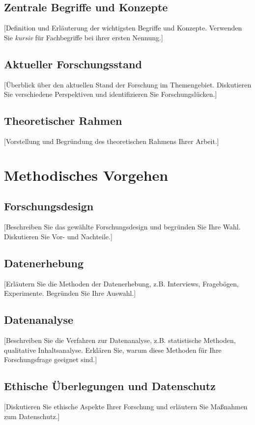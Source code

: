 \documentclass[12pt,a4paper,oneside]{article}
\begin{document}
\subsection{Zentrale Begriffe und Konzepte}
[Definition und Erläuterung der wichtigsten Begriffe und Konzepte. Verwenden Sie \textit{kursiv} für Fachbegriffe bei ihrer ersten Nennung.]

\subsection{Aktueller Forschungsstand}
[Überblick über den aktuellen Stand der Forschung im Themengebiet. Diskutieren Sie verschiedene Perspektiven und identifizieren Sie Forschungslücken.]

\subsection{Theoretischer Rahmen}
[Vorstellung und Begründung des theoretischen Rahmens Ihrer Arbeit.]

\clearpage
\section{Methodisches Vorgehen}
\subsection{Forschungsdesign}
[Beschreiben Sie das gewählte Forschungsdesign und begründen Sie Ihre Wahl. Diskutieren Sie Vor- und Nachteile.]

\subsection{Datenerhebung}
[Erläutern Sie die Methoden der Datenerhebung, z.B. Interviews, Fragebögen, Experimente. Begründen Sie Ihre Auswahl.]

\subsection{Datenanalyse}
[Beschreiben Sie die Verfahren zur Datenanalyse, z.B. statistische Methoden, qualitative Inhaltsanalyse. Erklären Sie, warum diese Methoden für Ihre Forschungsfrage geeignet sind.]

\subsection{Ethische Überlegungen und Datenschutz}
[Diskutieren Sie ethische Aspekte Ihrer Forschung und erläutern Sie Maßnahmen zum Datenschutz.]
\end{document}
